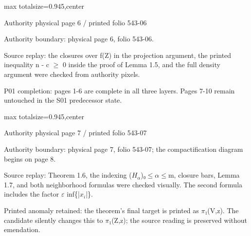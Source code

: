 \documentclass[10pt,a4paper]{article}
\begin{document}
\newpage
\noindent\begin{adjustbox}{max totalsize={\textwidth}{0.945\textheight},center}
\begin{minipage}{\textwidth}
\noindent\hfill\scriptsize Authority physical page 6 / printed folio 543-06\par\normalsize
\noindent Authority boundary: physical page 6, folio 543-06.\par\smallskip
\noindent Source replay: the closures over f(Z) in the projection argument, the printed inequality n - c \ensuremath{≥} 0 inside the proof of Lemma 1.5, and the full density argument were checked from authority pixels.\par\smallskip
\noindent P01 completion: pages 1-6 are complete in all three layers. Pages 7-10 remain untouched in the S01 predecessor state.\par\smallskip
\end{minipage}
\end{adjustbox}
\newpage
\noindent\begin{adjustbox}{max totalsize={\textwidth}{0.945\textheight},center}
\begin{minipage}{\textwidth}
\noindent\hfill\scriptsize Authority physical page 7 / printed folio 543-07\par\normalsize
\noindent Authority boundary: physical page 7, folio 543-07; the compactification diagram begins on page 8.\par\smallskip
\noindent Source replay: Theorem 1.6, the indexing (\ensuremath{H_α})\ensuremath{₀≤α≤}m, closure bars, Lemma 1.7, and both neighborhood formulas were checked visually. The second formula includes the factor \ensuremath{ε} inf\{|\ensuremath{x_i}|\}.\par\smallskip
\noindent Printed anomaly retained: the theorem's final target is printed as \ensuremath{π₁}(V,z). The candidate silently changes this to \ensuremath{π₁}(Z,z); the source reading is preserved without emendation.\par\smallskip
\end{minipage}
\end{adjustbox}
\newpage
\end{document}
